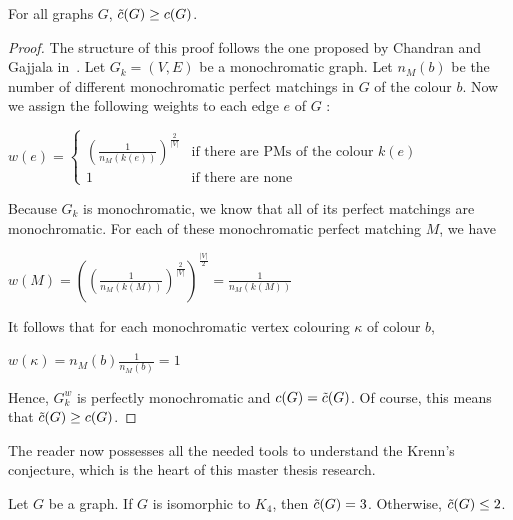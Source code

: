 \begin{observation}
    \label{obs:c_tilde_greater_than_c}
    For all graphs $G$, $\Tilde{c}(G) \geq c(G)$.
\end{observation}

\begin{proof}
    The structure of this proof follows the one proposed by Chandran and Gajjala in~\cite{chandran}.
    Let $G_k = (V, E)$ be a monochromatic graph.
    Let $n_{M}(b)$ be the number of different monochromatic perfect matchings in $G$ of the colour $b$.
    Now we assign the following weights to each edge $e$ of $G$ :
    
    \begin{center}
        $w(e) = \left\{
        \begin{array}{ll}
            \left(\frac{1}{n_{M}(k(e))}\right)^{\frac{2}{|V|}} & \mbox{if there are PMs of the colour } k(e) \\
            1 & \mbox{if there are none}
        \end{array}
        \right.$
    \end{center}

    Because $G_k$ is monochromatic, we know that all of its perfect matchings are monochromatic.
    For each of these monochromatic perfect matching $M$, we have
    
    \begin{center}
        $w(M) = \left( (\frac{1}{n_{M}(k(M))})^{\frac{2}{|V|}}\right)^{\frac{|V|}{2}} = \frac{1}{n_{M}(k(M))}$
    \end{center}
    
    It follows that for each monochromatic vertex colouring $\kappa$ of colour $b$,
    
    \begin{center}
        $w(\kappa) = n_{M}(b)\frac{1}{n_{M}(b)} = 1$
    \end{center}
    
    Hence, $G_k^w$ is perfectly monochromatic and $c(G) = \Tilde{c}(G)$.
    Of course, this means that $\Tilde{c}(G) \geq c(G)$.
\end{proof}

The reader now possesses all the needed tools to understand the Krenn's conjecture, which is the heart of this master thesis research.

\begin{conjecture}
    \label{con:krenn}
    Let $G$ be a graph.
    If $G$ is isomorphic to $K_4$, then $\Tilde{c}(G) = 3$.
    Otherwise, $\Tilde{c}(G) \leq 2$.
\end{conjecture}

